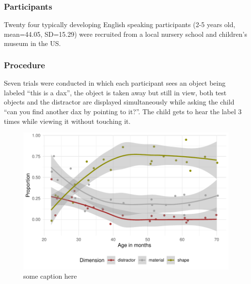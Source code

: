 \documentclass[10pt, letterpaper]{article}
\newenvironment{CodeChunk}{}{}
\begin{document}
\hypertarget{participants}{%
\subsubsection{Participants}\label{participants}}

Twenty four typically developing English speaking participants (2-5
years old, mean=44.05, SD=15.29) were recruited from a local nursery
school and children's museum in the US.

\hypertarget{procedure}{%
\subsubsection{Procedure}\label{procedure}}

Seven trials were conducted in which each participant sees an object
being labeled ``this is a dax'', the object is taken away but still in
view, both test objects and the distractor are displayed simultaneously
while asking the child ``can you find another dax by pointing to it?''.
The child gets to hear the label 3 times while viewing it without
touching it.

\begin{CodeChunk}
\begin{figure}[tb]
\includegraphics[width=1\linewidth]{figs/first_exp-1} \caption[some caption here]{some caption here}\label{fig:first_exp}
\end{figure}
\end{CodeChunk}
\end{document}
